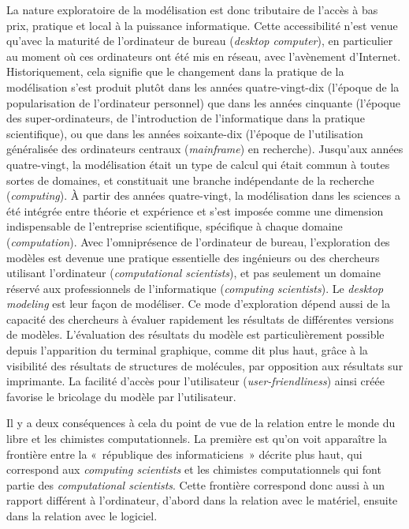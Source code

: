 \documentclass{FramateX}
\begin{document}
\begin{refsection}
La nature exploratoire de la modélisation est donc tributaire de
l'accès à bas prix, pratique et local à la puissance
informatique. Cette accessibilité n'est venue
qu'avec la maturité de l'ordinateur
de bureau (\textit{desktop computer}), en particulier au moment où ces
ordinateurs ont été mis en réseau, avec l'avènement
d'Internet. Historiquement, cela signifie que le
changement dans la pratique de la modélisation s'est
produit plutôt dans les années quatre-vingt-dix
(l'époque de la popularisation de
l'ordinateur personnel) que dans les années cinquante
(l'époque des super-ordinateurs, de
l'introduction de l'informatique dans
la pratique scientifique), ou que dans les années soixante-dix
(l'époque de l'utilisation
généralisée des ordinateurs centraux (\textit{mainframe}) en
recherche). Jusqu'aux années quatre-vingt, la
modélisation était un type de calcul qui était commun à toutes sortes
de domaines, et constituait une branche indépendante de la recherche
(\textit{computing}). À partir des années quatre-vingt, la modélisation
dans les sciences a été intégrée entre théorie et expérience et
s'est imposée comme une dimension indispensable de
l'entreprise scientifique, spécifique à chaque domaine
(\textit{computation}). Avec l'omniprésence de
l'ordinateur de bureau, l'exploration
des modèles est devenue une pratique essentielle des ingénieurs ou des
chercheurs utilisant l'ordinateur
(\textit{computational scientists}), et pas seulement un domaine
réservé aux professionnels de l'informatique
(\textit{computing scientists}). Le \textit{desktop modeling} est
leur façon de modéliser. Ce mode d'exploration dépend
aussi de la capacité des chercheurs à évaluer rapidement les résultats
de différentes versions de modèles. L'évaluation des
résultats du modèle est particulièrement possible depuis
l'apparition du terminal graphique, comme dit plus
haut, grâce à la visibilité des résultats de structures de molécules,
par opposition aux résultats sur imprimante. La facilité
d'accès pour l'utilisateur
(\textit{user-friendliness}) ainsi créée favorise le bricolage du
modèle par l'utilisateur.

Il y a deux conséquences à cela du point de vue de la relation entre le
monde du libre et les chimistes computationnels. La première est
qu'on voit apparaître la frontière entre la
«~république des informaticiens~» décrite plus haut, qui correspond aux
\textit{computing scientists} et les chimistes computationnels qui
font partie des \textit{computational scientists}. Cette frontière
correspond donc aussi à un rapport différent à
l'ordinateur, d'abord dans la
relation avec le matériel, ensuite dans la relation avec le logiciel. 


\end{refsection}
\end{document}
